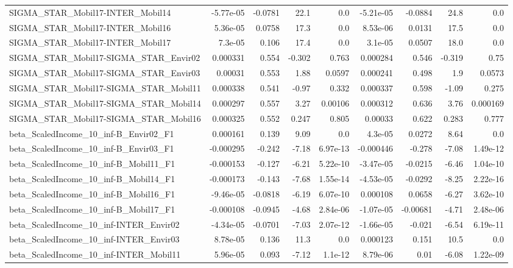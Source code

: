 \begin{tabular}{lrrrrrrrr}
SIGMA_STAR_Mobil17-INTER_Mobil14 & -5.77e-05 & -0.0781 & 22.1 & 0.0 & -5.21e-05 & -0.0884 & 24.8 & 0.0 \\
SIGMA_STAR_Mobil17-INTER_Mobil16 & 5.36e-05 & 0.0758 & 17.3 & 0.0 & 8.53e-06 & 0.0131 & 17.5 & 0.0 \\
SIGMA_STAR_Mobil17-INTER_Mobil17 & 7.3e-05 & 0.106 & 17.4 & 0.0 & 3.1e-05 & 0.0507 & 18.0 & 0.0 \\
SIGMA_STAR_Mobil17-SIGMA_STAR_Envir02 & 0.000331 & 0.554 & -0.302 & 0.763 & 0.000284 & 0.546 & -0.319 & 0.75 \\
SIGMA_STAR_Mobil17-SIGMA_STAR_Envir03 & 0.00031 & 0.553 & 1.88 & 0.0597 & 0.000241 & 0.498 & 1.9 & 0.0573 \\
SIGMA_STAR_Mobil17-SIGMA_STAR_Mobil11 & 0.000338 & 0.541 & -0.97 & 0.332 & 0.000337 & 0.598 & -1.09 & 0.275 \\
SIGMA_STAR_Mobil17-SIGMA_STAR_Mobil14 & 0.000297 & 0.557 & 3.27 & 0.00106 & 0.000312 & 0.636 & 3.76 & 0.000169 \\
SIGMA_STAR_Mobil17-SIGMA_STAR_Mobil16 & 0.000325 & 0.552 & 0.247 & 0.805 & 0.00033 & 0.622 & 0.283 & 0.777 \\
beta_ScaledIncome_10_inf-B_Envir02_F1 & 0.000161 & 0.139 & 9.09 & 0.0 & 4.3e-05 & 0.0272 & 8.64 & 0.0 \\
beta_ScaledIncome_10_inf-B_Envir03_F1 & -0.000295 & -0.242 & -7.18 & 6.97e-13 & -0.000446 & -0.278 & -7.08 & 1.49e-12 \\
beta_ScaledIncome_10_inf-B_Mobil11_F1 & -0.000153 & -0.127 & -6.21 & 5.22e-10 & -3.47e-05 & -0.0215 & -6.46 & 1.04e-10 \\
beta_ScaledIncome_10_inf-B_Mobil14_F1 & -0.000173 & -0.143 & -7.68 & 1.55e-14 & -4.53e-05 & -0.0292 & -8.25 & 2.22e-16 \\
beta_ScaledIncome_10_inf-B_Mobil16_F1 & -9.46e-05 & -0.0818 & -6.19 & 6.07e-10 & 0.000108 & 0.0658 & -6.27 & 3.62e-10 \\
beta_ScaledIncome_10_inf-B_Mobil17_F1 & -0.000108 & -0.0945 & -4.68 & 2.84e-06 & -1.07e-05 & -0.00681 & -4.71 & 2.48e-06 \\
beta_ScaledIncome_10_inf-INTER_Envir02 & -4.34e-05 & -0.0701 & -7.03 & 2.07e-12 & -1.66e-05 & -0.021 & -6.54 & 6.19e-11 \\
beta_ScaledIncome_10_inf-INTER_Envir03 & 8.78e-05 & 0.136 & 11.3 & 0.0 & 0.000123 & 0.151 & 10.5 & 0.0 \\
beta_ScaledIncome_10_inf-INTER_Mobil11 & 5.96e-05 & 0.093 & -7.12 & 1.1e-12 & 8.79e-06 & 0.01 & -6.08 & 1.22e-09 \\

\end{tabular}
